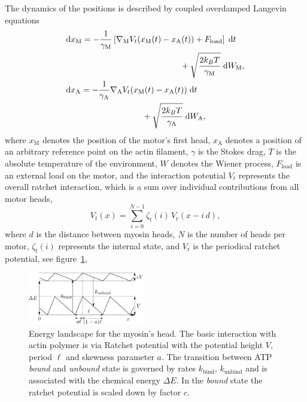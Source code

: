 \documentclass[aps,pre,twocolumn,showpacs,showkeys,superscriptaddress,floatfix]{revtex4-1}
\newcommand{\rmd}{{\mathrm d}}
\begin{document}
The dynamics of the positions is described by coupled overdamped Langevin equations 
\begin{align}
&\begin{multlined}[b]
\rmd x_\text{M} = 
- \frac{1}{\gamma_\text{M}} \left[ \nabla_\text{M} V_t(x_\text{M}(t) - x_\text{A}(t)) + F_\text{load} \right] \; \rmd t 
\\ 
+ \sqrt{ \frac{2 k_B T}{\gamma_\text{M}} } \; \rmd W_\text{M} ,
\end{multlined}
\label{eq:eom_M} \\
&\begin{multlined}[b][.42\textwidth]
\rmd x_\text{A} = 
- \frac{1}{\gamma_\text{A}} \nabla_\text{A} V_t(x_\text{M}(t) - x_\text{A}(t)) \; \rmd t 
\\
+ \sqrt{ \frac{2 k_B T}{\gamma_\text{A}} } \; \rmd W_\text{A} ,
\end{multlined}
\label{eq:eom_A}
\end{align}
where $x_\text{M}$ denotes the position of the motor's first head, 
$x_\text{A}$ denotes a position of an arbitrary reference point on the actin filament, 
$\gamma$ is the Stokes drag,
$T$ is the absolute temperature of the environment,
$W$ denotes the Wiener process,
$F_\text{load}$ is an external load on the motor, 
and the interaction potential $V_t$ represents the overall ratchet interaction, 
which is a sum over individual contributions from all motor heads,
\begin{equation}
V_t(x) = \sum\limits_{i=0}^{N-1} \zeta_t(i) \, V_\text{r} (x - i \, d ), 
\label{eq:ratchet_interaction}
\end{equation}
where $d$ is the distance between myosin heads, 
$N$ is the number of heads per motor,
$\zeta_t(i)$ represents the internal state, 
and $V_\text{r}$ is the periodical ratchet potential, see figure~\ref{fig:energy},
\begin{figure}[t]
\centering
\includegraphics[width=0.45\textwidth,height=!]{energy}
\caption{
\label{fig:energy}
Energy landscape for the myosin's head.
The basic interaction with actin polymer is via Ratchet potential with the potential height $V$, period $\ell$ and skewness parameter $a$.
The transition between ATP \emph{bound} and \emph{unbound} state is governed by rates $k_\text{bind}$, $k_\text{unbind}$ 
and is associated with the chemical energy $\Delta E$.
In the \emph{bound} state the ratchet potential is scaled down by factor $c$. 
}
\end{figure}
\end{document}
